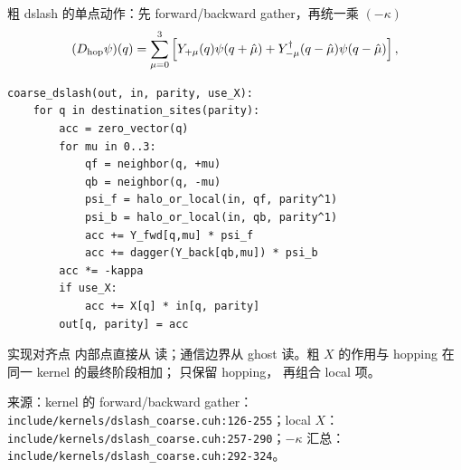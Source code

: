 \documentclass[UTF8,aspectratio=169,11pt]{ctexbeamer}
\newcommand{\source}[1]{\vspace{0.05em}\par{\raggedright\scriptsize\color{muted}来源：#1\par}}
\newcommand{\codepath}[1]{\nolinkurl{#1}}
\begin{document}
\begin{frame}[fragile,t]{粗 dslash 的单点动作：先 forward/backward gather，再统一乘 \((-\kappa)\)}
  \begin{equation*}
    (D_{\rm hop}\psi)(q)=
    \sum_{\mu=0}^{3}\left[
      Y_{+\mu}(q)\psi(q+\hat\mu)+
      Y_{-\mu}^{\dagger}(q-\hat\mu)\psi(q-\hat\mu)
    \right],
  \end{equation*}
  \begin{lstlisting}[firstnumber=1]
coarse_dslash(out, in, parity, use_X):
    for q in destination_sites(parity):
        acc = zero_vector(q)
        for mu in 0..3:
            qf = neighbor(q, +mu)
            qb = neighbor(q, -mu)
            psi_f = halo_or_local(in, qf, parity^1)
            psi_b = halo_or_local(in, qb, parity^1)
            acc += Y_fwd[q,mu] * psi_f
            acc += dagger(Y_back[qb,mu]) * psi_b
        acc *= -kappa
        if use_X:
            acc += X[q] * in[q, parity]
        out[q, parity] = acc
  \end{lstlisting}
  \vspace{0.05cm}
  \begin{block}{实现对齐点}
    内部点直接从 \texttt{} 读；通信边界从 ghost 读。粗 \(X\) 的作用与 hopping 在同一 kernel 的最终阶段相加；\texttt{} 只保留 hopping，\texttt{} 再组合 local 项。
  \end{block}
  \source{kernel 的 forward/backward gather：\codepath{include/kernels/dslash_coarse.cuh:126-255}；local \(X\)：\codepath{include/kernels/dslash_coarse.cuh:257-290}；\(-\kappa\) 汇总：\codepath{include/kernels/dslash_coarse.cuh:292-324}。}
\end{frame}
\end{document}
